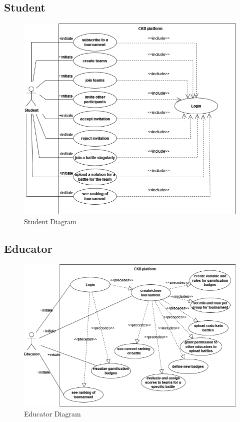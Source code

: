 \subsection{Student}
\begin{figure}[H]
    \begin{center}
        \includegraphics[width=0.8\linewidth]{Images/UCD_Student.png}
        \caption{Student Diagram}
        \label{fig:student_uc_diagram}%
    \end{center}
\end{figure}
\subsection{Educator}
\begin{figure}[H]
    \begin{center}
        \includegraphics[width=0.8\linewidth]{Images/UCD_Educators.png}
        \caption{Educator Diagram}
        \label{fig:class_diagram}%
    \end{center}
\end{figure}


